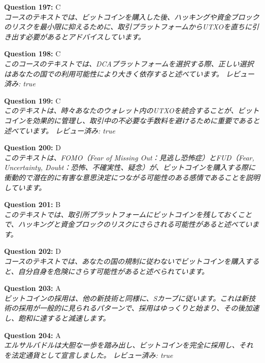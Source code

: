 \documentclass[12pt,a4paper]{article}
\begin{document}
\begin{enumerate}
{{{{{{{{{\item \textbf{Question 197:} C
\\ \textit{コースのテキストでは、ビットコインを購入した後、ハッキングや資金ブロックのリスクを最小限に抑えるために、取引プラットフォームからUTXOを直ちに引き出す必要があるとアドバイスしています。}

\item \textbf{Question 198:} C
\\ \textit{このコースのテキストでは、DCAプラットフォームを選択する際、正しい選択はあなたの国での利用可能性により大きく依存すると述べています。
レビュー済み: true}

\item \textbf{Question 199:} C
\\ \textit{このテキストは、時々あなたのウォレット内のUTXOを統合することが、ビットコインを効果的に管理し、取引中の不必要な手数料を避けるために重要であると述べています。 レビュー済み: true}

\item \textbf{Question 200:} D
\\ \textit{このテキストは、FOMO（Fear of Missing Out：見逃し恐怖症）とFUD（Fear, Uncertainty, Doubt：恐怖、不確実性、疑念）が、ビットコインを購入する際に衝動的で潜在的に有害な意思決定につながる可能性のある感情であることを説明しています。}

\item \textbf{Question 201:} B
\\ \textit{このテキストでは、取引所プラットフォームにビットコインを残しておくことで、ハッキングと資金ブロックのリスクにさらされる可能性があると述べています。}

\item \textbf{Question 202:} D
\\ \textit{コースのテキストでは、あなたの国の規制に従わないでビットコインを購入すると、自分自身を危険にさらす可能性があると述べられています。}

\item \textbf{Question 203:} A
\\ \textit{ビットコインの採用は、他の新技術と同様に、Sカーブに従います。これは新技術の採用が一般的に見られるパターンで、採用はゆっくりと始まり、その後加速し、飽和に達すると減速します。}

\item \textbf{Question 204:} A
\\ \textit{エルサルバドルは大胆な一歩を踏み出し、ビットコインを完全に採用し、それを法定通貨として宣言しました。 レビュー済み: true}

}}}}}}}}}
\end{enumerate}
\end{document}
